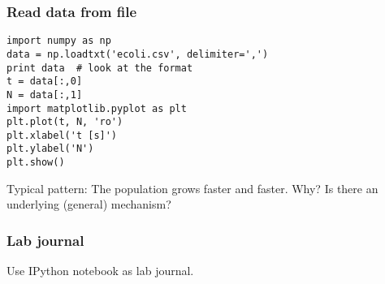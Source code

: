 \documentclass{beamer}
\begin{document}
\begin{frame}
\frametitle{Read data from file}

\begin{block}{}
\begin{verbatim}
import numpy as np
data = np.loadtxt('ecoli.csv', delimiter=',')
print data  # look at the format
t = data[:,0]
N = data[:,1]
import matplotlib.pyplot as plt
plt.plot(t, N, 'ro')
plt.xlabel('t [s]')
plt.ylabel('N')
plt.show()
\end{verbatim}
\end{block}

\begin{block}{Typical pattern: }
The population grows faster and faster. Why? Is there an
underlying (general) mechanism?
\end{block}
\end{frame}

\begin{frame}
\frametitle{Lab journal}

\begin{block}{}
Use IPython notebook as lab journal.
\end{block}
\end{frame}
\end{document}

